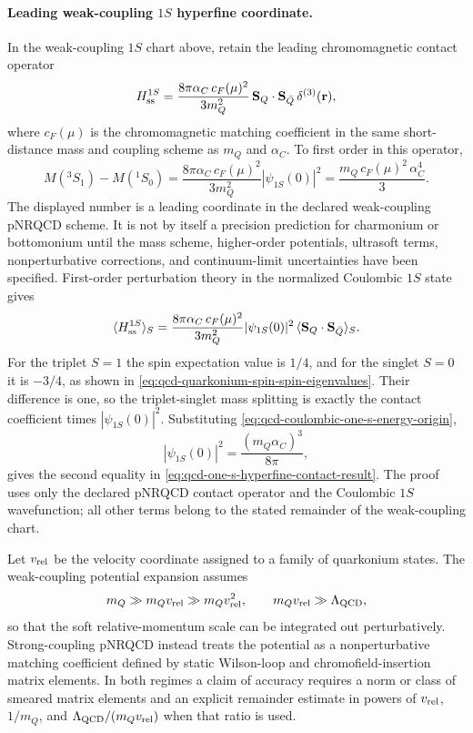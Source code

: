 \paragraph{Leading weak-coupling \(1S\) hyperfine coordinate.}
In the weak-coupling \(1S\) chart above, retain the leading
chromomagnetic contact operator
\begin{equation}
  H_{\rm ss}^{1S}
  =
  \frac{8\pi\alpha_C\,c_F(\mu)^2}{3m_Q^2}\,
  \mathbf S_Q\cdot\mathbf S_{\bar Q}\,
  \delta^{(3)}(\mathbf r),
  \label{eq:qcd-pnrqcd-contact-spin-spin}
\end{equation}
where \(c_F(\mu)\) is the chromomagnetic matching coefficient in the same
short-distance mass and coupling scheme as \(m_Q\) and \(\alpha_C\).  To first
order in this operator,
\begin{equation}
  M(^3S_1)-M(^1S_0)
  =
  \frac{8\pi\alpha_C\,c_F(\mu)^2}{3m_Q^2}
  |\psi_{1S}(0)|^2
  =
  \frac{m_Q\,c_F(\mu)^2\,\alpha_C^4}{3}.
  \label{eq:qcd-one-s-hyperfine-contact-result}
\end{equation}
The displayed number is a leading coordinate in the declared weak-coupling
pNRQCD scheme.  It is not by itself a precision prediction for charmonium or
bottomonium until the mass scheme, higher-order potentials, ultrasoft terms,
nonperturbative corrections, and continuum-limit uncertainties have been
specified.
First-order perturbation theory in the normalized Coulombic \(1S\) state gives
\[
  \langle H_{\rm ss}^{1S}\rangle_{S}
  =
  \frac{8\pi\alpha_C\,c_F(\mu)^2}{3m_Q^2}
  |\psi_{1S}(0)|^2\,
  \langle\mathbf S_Q\cdot\mathbf S_{\bar Q}\rangle_S .
\]
For the triplet \(S=1\) the spin expectation value is \(1/4\), and for the
singlet \(S=0\) it is \(-3/4\), as shown in
\eqref{eq:qcd-quarkonium-spin-spin-eigenvalues}.  Their difference is one, so
the triplet-singlet mass splitting is exactly the contact coefficient times
\(|\psi_{1S}(0)|^2\).  Substituting
\eqref{eq:qcd-coulombic-one-s-energy-origin},
\[
  |\psi_{1S}(0)|^2=\frac{(m_Q\alpha_C)^3}{8\pi},
\]
gives the second equality in
\eqref{eq:qcd-one-s-hyperfine-contact-result}.  The proof uses only the
declared pNRQCD contact operator and the Coulombic \(1S\) wavefunction; all
other terms belong to the stated remainder of the weak-coupling chart.

\begin{controlledapproximation}
\label{ca:nrqcd-pnrqcd-scale-separation}
Let \(v_{\rm rel}\) be the velocity coordinate assigned to a family of
quarkonium states.  The weak-coupling potential expansion assumes
\[
  m_Q\gg m_Qv_{\rm rel}\gg m_Qv_{\rm rel}^2,
  \qquad
  m_Qv_{\rm rel}\gg \Lambda_{\rm QCD},
\]
so that the soft relative-momentum scale can be integrated out
perturbatively.  Strong-coupling pNRQCD instead treats the potential as a
nonperturbative matching coefficient defined by static Wilson-loop and
chromofield-insertion matrix elements.  In both regimes a claim of accuracy
requires a norm or class of smeared matrix elements and an explicit remainder
estimate in powers of \(v_{\rm rel}\), \(1/m_Q\), and
\(\Lambda_{\rm QCD}/(m_Qv_{\rm rel})\) when that ratio is used.
\end{controlledapproximation}

